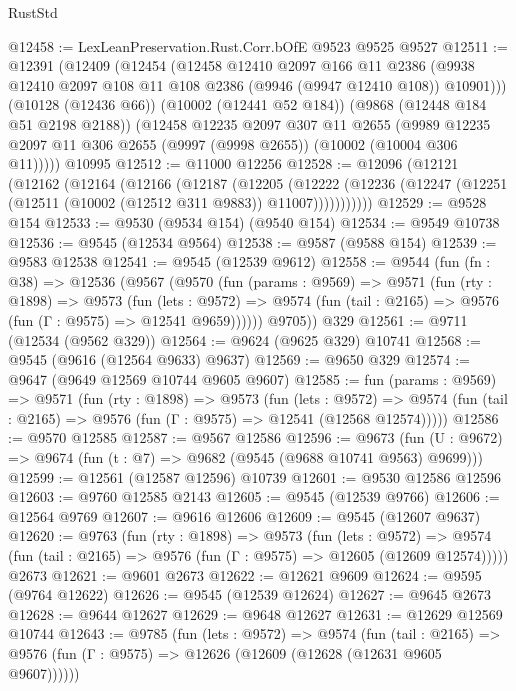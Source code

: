 \begin{lexlean}{RustStd}
\begin{coremodule}
@12458 := LexLeanPreservation.Rust.Corr.bOfE @9523 @9525 @9527
@12511 := @12391
    (@12409
      (@12454
        (@12458
          @12410
          @2097
          @166
          @11
          @2386
          (@9938 @12410 @2097 @108 @11 @108 @2386 (@9946 (@9947 @12410 @108)) @10901)))
      (@10128 (@12436 @66))
      (@10002 (@12441 @52 @184))
      (@9868 (@12448 @184 @51 @2198 @2188))
      (@12458
        @12235
        @2097
        @307
        @11
        @2655
        (@9989 @12235 @2097 @11 @306 @2655 (@9997 (@9998 @2655)) (@10002 (@10004 @306 @11)))))
    @10995
@12512 := @11000 @12256
@12528 := @12096
    (@12121
      (@12162
        (@12164
          (@12166
            (@12187
              (@12205
                (@12222
                  (@12236 (@12247 (@12251 (@12511 (@10002 (@12512 @311 @9883)) @11007)))))))))))
@12529 := @9528 @154
@12533 := @9530 (@9534 @154) (@9540 @154)
@12534 := @9549 @10738
@12536 := @9545 (@12534 @9564)
@12538 := @9587 (@9588 @154)
@12539 := @9583 @12538
@12541 := @9545 (@12539 @9612)
@12558 := @9544
    (fun (fn : @38) =>
    @12536
      (@9567
        (@9570
          (fun (params : @9569) =>
          @9571
            (fun (rty : @1898) =>
            @9573
              (fun (lets : @9572) =>
              @9574 (fun (tail : @2165) => @9576 (fun (Γ : @9575) => @12541 @9659))))))
        @9705))
    @329
@12561 := @9711 (@12534 (@9562 @329))
@12564 := @9624 (@9625 @329) @10741
@12568 := @9545 (@9616 (@12564 @9633) @9637)
@12569 := @9650 @329
@12574 := @9647 (@9649 @12569 @10744 @9605 @9607)
@12585 := fun (params : @9569) =>
  @9571
    (fun (rty : @1898) =>
    @9573
      (fun (lets : @9572) =>
      @9574 (fun (tail : @2165) => @9576 (fun (Γ : @9575) => @12541 (@12568 @12574)))))
@12586 := @9570 @12585
@12587 := @9567 @12586
@12596 := @9673
    (fun (U : @9672) => @9674 (fun (t : @7) => @9682 (@9545 (@9688 @10741 @9563) @9699)))
@12599 := @12561 (@12587 @12596) @10739
@12601 := @9530 @12586 @12596
@12603 := @9760 @12585 @2143
@12605 := @9545 (@12539 @9766)
@12606 := @12564 @9769
@12607 := @9616 @12606
@12609 := @9545 (@12607 @9637)
@12620 := @9763
    (fun (rty : @1898) =>
    @9573
      (fun (lets : @9572) =>
      @9574 (fun (tail : @2165) => @9576 (fun (Γ : @9575) => @12605 (@12609 @12574)))))
    @2673
@12621 := @9601 @2673
@12622 := @12621 @9609
@12624 := @9595 (@9764 @12622)
@12626 := @9545 (@12539 @12624)
@12627 := @9645 @2673
@12628 := @9644 @12627
@12629 := @9648 @12627
@12631 := @12629 @12569 @10744
@12643 := @9785
    (fun (lets : @9572) =>
    @9574
      (fun (tail : @2165) =>
      @9576 (fun (Γ : @9575) => @12626 (@12609 (@12628 (@12631 @9605 @9607))))))

\end{coremodule}
\end{lexlean}
